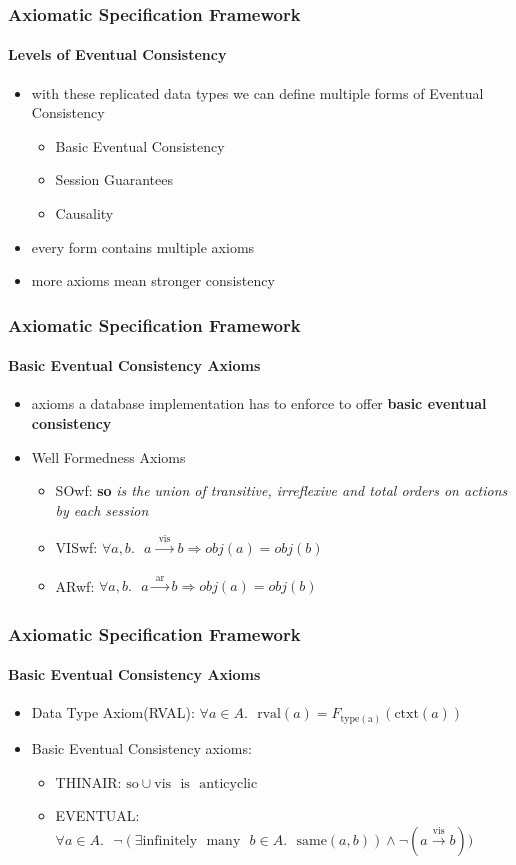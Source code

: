 \documentclass[11pt]{beamer}
\begin{document}
\begin{frame}
\frametitle{Axiomatic Specification Framework}
\framesubtitle{Levels of Eventual Consistency}
\begin{itemize}
\item with these replicated data types we can define multiple forms of Eventual Consistency
\begin{itemize}
\item Basic Eventual Consistency
\item Session Guarantees
\item Causality
\end{itemize}
\item every form contains multiple axioms
\item more axioms mean stronger consistency
\end{itemize}
\end{frame}

\begin{frame}
\frametitle{Axiomatic Specification Framework}
\framesubtitle{Basic Eventual Consistency Axioms}
\begin{itemize}
\item axioms a database implementation has to enforce to offer \textbf{basic eventual consistency} 
\item Well Formedness Axioms
\begin{itemize}
\item SOwf: \textbf{so} \textit{is the union of transitive, irreflexive and total orders
on actions by each session}
\item VISwf: \(\forall a,b. \text{ } a \xrightarrow[]{\text{ vis }}b \Rightarrow obj(a) = obj(b) \)
\item ARwf: \(\forall a,b. \text{ } a \xrightarrow[]{\text{ ar }} b \Rightarrow obj(a) = obj(b) \)
\end{itemize}
\end{itemize}
\end{frame}

\begin{frame}
\frametitle{Axiomatic Specification Framework}
\framesubtitle{Basic Eventual Consistency Axioms}
\begin{itemize}
\item Data Type Axiom(RVAL): \linebreak \(\forall a \in A. \text{ } \mathrm{rval}(a) = F \mathrm{_{type(a)}} (\mathrm{ctxt}(a))\)
\item Basic Eventual Consistency axioms:
\begin{itemize}
\item THINAIR: \linebreak \(\mathrm{so} \cup \mathrm{vis} \text{ } \mathrm{is} \text{ } \mathrm{anticyclic} \) 
\item EVENTUAL: \linebreak \(\forall a \in A. \text{ } \neg(\exists \mathrm{infinitely} \text{ } \mathrm{many} \text{ } b  \in A. \text{ } \mathrm{same}(a,b)) \wedge \neg(a \xrightarrow[]{\text{vis}} b)) \)
\end{itemize}
\end{itemize}
\end{frame}
\end{document}

